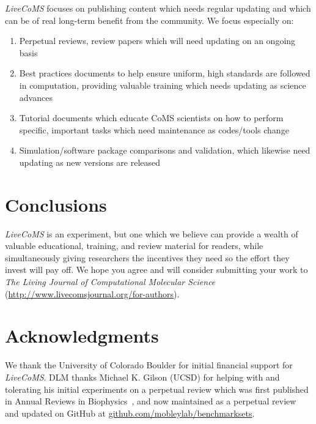 \documentclass[9pt,editorial]{livecoms}
\begin{document}
\emph{LiveCoMS} focuses on publishing content which needs regular updating and which can be of real long-term benefit from the community.
We focus especially on:
\begin{enumerate}
\item Perpetual reviews, review papers which will need updating on an ongoing basis
\item Best practices documents to help ensure uniform, high standards are followed in computation, providing valuable training which needs updating as science advances
\item Tutorial documents which educate CoMS scientists on how to perform specific, important tasks which need maintenance as codes/tools change
\item Simulation/software package comparisons and validation, which likewise need updating as new versions are released
\end{enumerate}

\section{Conclusions}

\emph{LiveCoMS} is an experiment, but one which we believe can provide a wealth of valuable educational, training, and review material for readers, while simultaneously giving researchers the incentives they need so the effort they invest will pay off.
We hope you agree and will consider submitting your work to \emph{The Living Journal of Computational Molecular Science} (\url{http://www.livecomsjournal.org/for-authors}).


\section{Acknowledgments}

We thank the University of Colorado Boulder for initial financial support for \emph{LiveCoMS}. 
DLM thanks Michael K. Gilson (UCSD) for helping with and tolerating his initial experiments on a perpetual review which was first published in Annual Reviews in Biophysics~\cite{Mobley:2017:AnnualReviewofBiophysics}, and now maintained as a perpetual review~\cite{Mobley:2017:eScholarshipa} and updated on GitHub at \url{github.com/mobleylab/benchmarksets}.


\end{document}
